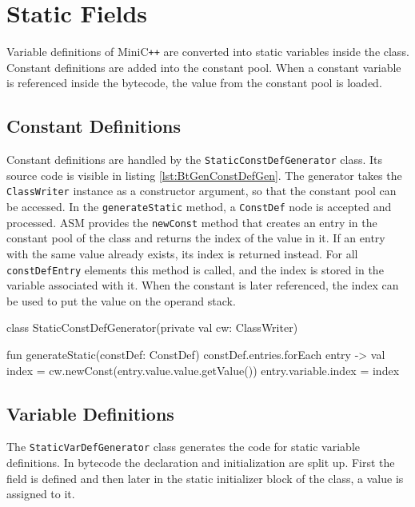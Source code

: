 \section{Static Fields}

Variable definitions of MiniC\verb|++| are converted into static variables inside the class. Constant definitions are added into the constant pool. When a constant variable is referenced inside the bytecode, the value from the constant pool is loaded. 

\subsection{Constant Definitions}

Constant definitions are handled by the \verb|StaticConstDefGenerator| class. Its source code is visible in listing \ref{lst:BtGenConstDefGen}. The generator takes the \verb|ClassWriter| instance as a constructor argument, so that the constant pool can be accessed. In the \verb|generateStatic| method, a \verb|ConstDef| node is accepted and processed. ASM provides the \verb|newConst| method that creates an entry in the constant pool of the class and returns the index of the value in it. If an entry with the same value already exists, its index is returned instead. For all \verb|constDefEntry| elements this method is called, and the index is stored in the variable associated with it. When the constant is later referenced, the index can be used to put the value on the operand stack.


\begin{KotlinCode}[float,numbers=none,caption=Code of the \texttt{StaticConstDefGenerator} class., label=lst:BtGenConstDefGen]
class StaticConstDefGenerator(private val cw: ClassWriter) {

fun generateStatic(constDef: ConstDef) {
    constDef.entries.forEach { entry ->
        val index = cw.newConst(entry.value.value.getValue())
        entry.variable.index = index
    }
}
}
\end{KotlinCode}

\subsection{Variable Definitions}

The \verb|StaticVarDefGenerator| class generates the code for static variable definitions. In bytecode the declaration and initialization are split up. First the field is defined and then later in the static initializer block of the class, a value is assigned to it.

